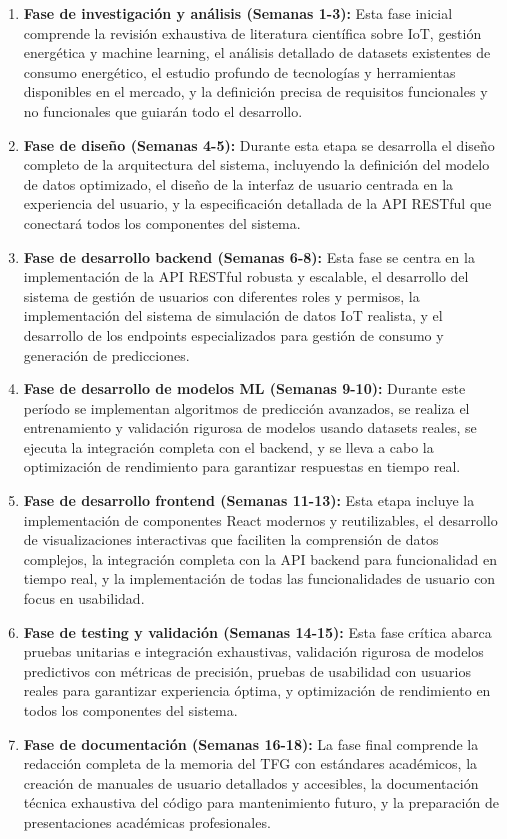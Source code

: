 \begin{enumerate}
    \item \textbf{Fase de investigación y análisis (Semanas 1-3):} Esta fase inicial comprende la revisión exhaustiva de literatura científica sobre IoT, gestión energética y machine learning, el análisis detallado de datasets existentes de consumo energético, el estudio profundo de tecnologías y herramientas disponibles en el mercado, y la definición precisa de requisitos funcionales y no funcionales que guiarán todo el desarrollo.
    
    \item \textbf{Fase de diseño (Semanas 4-5):} Durante esta etapa se desarrolla el diseño completo de la arquitectura del sistema, incluyendo la definición del modelo de datos optimizado, el diseño de la interfaz de usuario centrada en la experiencia del usuario, y la especificación detallada de la API RESTful que conectará todos los componentes del sistema.
    
    \item \textbf{Fase de desarrollo backend (Semanas 6-8):} Esta fase se centra en la implementación de la API RESTful robusta y escalable, el desarrollo del sistema de gestión de usuarios con diferentes roles y permisos, la implementación del sistema de simulación de datos IoT realista, y el desarrollo de los endpoints especializados para gestión de consumo y generación de predicciones.
    
    \item \textbf{Fase de desarrollo de modelos ML (Semanas 9-10):} Durante este período se implementan algoritmos de predicción avanzados, se realiza el entrenamiento y validación rigurosa de modelos usando datasets reales, se ejecuta la integración completa con el backend, y se lleva a cabo la optimización de rendimiento para garantizar respuestas en tiempo real.
    
    \item \textbf{Fase de desarrollo frontend (Semanas 11-13):} Esta etapa incluye la implementación de componentes React modernos y reutilizables, el desarrollo de visualizaciones interactivas que faciliten la comprensión de datos complejos, la integración completa con la API backend para funcionalidad en tiempo real, y la implementación de todas las funcionalidades de usuario con focus en usabilidad.
    
    \item \textbf{Fase de testing y validación (Semanas 14-15):} Esta fase crítica abarca pruebas unitarias e integración exhaustivas, validación rigurosa de modelos predictivos con métricas de precisión, pruebas de usabilidad con usuarios reales para garantizar experiencia óptima, y optimización de rendimiento en todos los componentes del sistema.
    
    \item \textbf{Fase de documentación (Semanas 16-18):} La fase final comprende la redacción completa de la memoria del TFG con estándares académicos, la creación de manuales de usuario detallados y accesibles, la documentación técnica exhaustiva del código para mantenimiento futuro, y la preparación de presentaciones académicas profesionales.
\end{enumerate}

